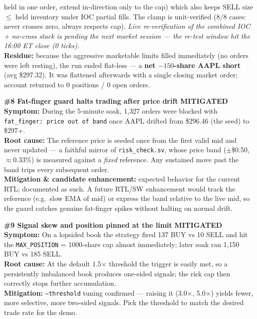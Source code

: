 \documentclass[10pt,a4paper]{article}
\newcommand{\mitig}{\textcolor{warnamber}{\textbf{MITIGATED}}}
\begin{document}
\begin{issuebox}
held in one order, extend in-direction only to the cap) which also keeps SELL
size $\le$ held inventory under IOC partial fills. The clamp is unit-verified
(8/8 cases: never crosses zero, always respects cap). \emph{Live re-verification
of the combined IOC + no-cross stack is pending the next market session --- the
re-test window hit the 16:00 ET close (0 ticks).}\\
\textbf{Residue:} because the aggressive marketable limits filled immediately
(no orders were left resting), the run ended flat-less --- a \textbf{net
$-150$-share AAPL short} (avg \$297.32). It was flattened afterwards with a
single closing market order; account returned to 0 positions / 0 open orders.
\end{issuebox}

\begin{issuebox}
\textbf{\#8 \quad Fat-finger guard halts trading after price drift} \hfill \mitig\\
\textbf{Symptom:} During the 5-minute soak, 1{,}327 orders were blocked with
\texttt{fat\_finger: price out of band} once AAPL drifted from \$296.46 (the
seed) to \$297+.\\
\textbf{Root cause:} The reference price is seeded once from the first valid mid
and never updated --- a faithful mirror of \texttt{risk\_check.sv}, whose price
band ($\pm$\$0.50, \(\approx\)0.33\%) is measured against a \emph{fixed}
reference. Any sustained move past the band trips every subsequent order.\\
\textbf{Mitigation \& candidate enhancement:} expected behavior for the current
RTL; documented as such. A future RTL/SW enhancement would track the reference
(e.g.\ slow EMA of mid) or express the band relative to the live mid, so the
guard catches genuine fat-finger spikes without halting on normal drift.
\end{issuebox}

\begin{issuebox}
\textbf{\#9 \quad Signal skew and position pinned at the limit} \hfill \mitig\\
\textbf{Symptom:} On a lopsided book the strategy fired 137 BUY vs 10 SELL and
hit the \texttt{MAX\_POSITION} = 1000-share cap almost immediately; later soak ran
1{,}150 BUY vs 185 SELL.\\
\textbf{Root cause:} At the default 1.5\(\times\) threshold the trigger is easily
met, so a persistently imbalanced book produces one-sided signals; the risk cap
then correctly stops further accumulation.\\
\textbf{Mitigation:} \texttt{--threshold} tuning confirmed --- raising it
(3.0\(\times\), 5.0\(\times\)) yields fewer, more selective, more two-sided
signals. Pick the threshold to match the desired trade rate for the demo.
\end{issuebox}
\end{document}
